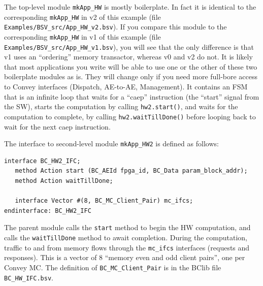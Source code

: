 \documentclass[twoside,letterpaper,11pt]{article}
\begin{document}
The top-level module \verb|mkApp_HW| is mostly boilerplate.  In fact
it is identical to the corresponding \verb|mkApp_HW| in v2 of this
example (file \verb|Examples/BSV_src/App_HW_v2.bsv|).  If you compare
this module to the corresponding \verb|mkApp_HW| in v1 of this example
(file \verb|Examples/BSV_src/App_HW_v1.bsv|), you will see that the
only difference is that v1 uses an ``ordering'' memory transactor,
whereas v0 and v2 do not.  It is likely that most applications you
write will be able to use one or the other of these two boilerplate
modules as is.  They will change only if you need more full-bore
access to Convey interfaces (Dispatch, AE-to-AE, Management).  It
contains an FSM that is an infinite loop that waits for a ``caep''
instruction (the ``start'' signal from the SW), starts the computation
by calling \verb|hw2.start()|, and waits for the computation to
complete, by calling \verb|hw2.waitTillDone()| before looping back to
wait for the next caep instruction.

The interface to second-level module \verb|mkApp_HW2| is defined as
follows:

\begin{Verbatim}[frame=single, label=App\_HW\_v0.bsv]  
interface BC_HW2_IFC;
   method Action start (BC_AEId fpga_id, BC_Data param_block_addr);
   method Action waitTillDone;

   interface Vector #(8, BC_MC_Client_Pair) mc_ifcs;
endinterface: BC_HW2_IFC
\end{Verbatim}

The parent module calls the \verb|start| method to begin the HW
computation, and calls the \verb|waitTillDone| method to await
completion.  During the computation, traffic to and from memory flows
through the \verb|mc_ifcs| interfaces (requests and responses).  This
is a vector of 8 ``memory even and odd client pairs'', one per Convey
MC.  The definition of \verb|BC_MC_Client_Pair| is in the BClib file
\verb|BC_HW_IFC.bsv|.
\end{document}
